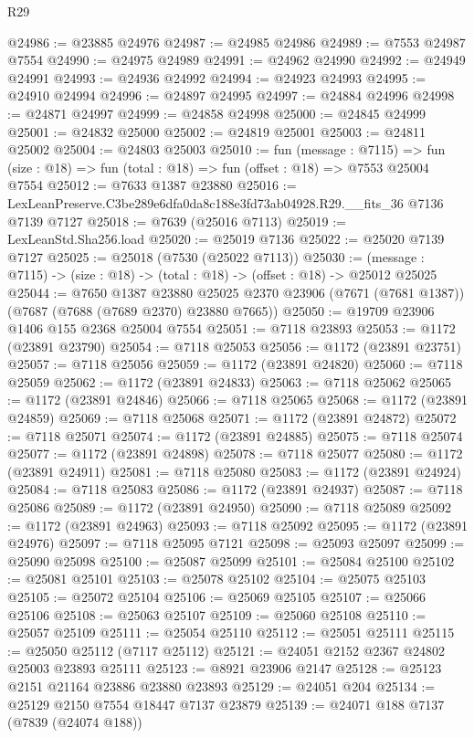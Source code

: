 \begin{lexlean}{R29}
\begin{coremodule}
@24986 := @23885 @24976
@24987 := @24985 @24986
@24989 := @7553 @24987 @7554
@24990 := @24975 @24989
@24991 := @24962 @24990
@24992 := @24949 @24991
@24993 := @24936 @24992
@24994 := @24923 @24993
@24995 := @24910 @24994
@24996 := @24897 @24995
@24997 := @24884 @24996
@24998 := @24871 @24997
@24999 := @24858 @24998
@25000 := @24845 @24999
@25001 := @24832 @25000
@25002 := @24819 @25001
@25003 := @24811 @25002
@25004 := @24803 @25003
@25010 := fun (message : @7115) =>
  fun (size : @18) => fun (total : @18) => fun (offset : @18) => @7553 @25004 @7554
@25012 := @7633 @1387 @23880
@25016 := LexLeanPreserve.C3be289e6dfa0da8c188e3fd73ab04928.R29.__fits_36 @7136 @7139 @7127
@25018 := @7639 (@25016 @7113)
@25019 := LexLeanStd.Sha256.load
@25020 := @25019 @7136
@25022 := @25020 @7139 @7127
@25025 := @25018 (@7530 (@25022 @7113))
@25030 := (message : @7115) -> (size : @18) -> (total : @18) -> (offset : @18) -> @25012 @25025
@25044 := @7650
    @1387
    @23880
    @25025
    @2370
    @23906
    (@7671 (@7681 @1387))
    (@7687 (@7688 (@7689 @2370) @23880 @7665))
@25050 := @19709 @23906 @1406 @155 @2368 @25004 @7554
@25051 := @7118 @23893
@25053 := @1172 (@23891 @23790)
@25054 := @7118 @25053
@25056 := @1172 (@23891 @23751)
@25057 := @7118 @25056
@25059 := @1172 (@23891 @24820)
@25060 := @7118 @25059
@25062 := @1172 (@23891 @24833)
@25063 := @7118 @25062
@25065 := @1172 (@23891 @24846)
@25066 := @7118 @25065
@25068 := @1172 (@23891 @24859)
@25069 := @7118 @25068
@25071 := @1172 (@23891 @24872)
@25072 := @7118 @25071
@25074 := @1172 (@23891 @24885)
@25075 := @7118 @25074
@25077 := @1172 (@23891 @24898)
@25078 := @7118 @25077
@25080 := @1172 (@23891 @24911)
@25081 := @7118 @25080
@25083 := @1172 (@23891 @24924)
@25084 := @7118 @25083
@25086 := @1172 (@23891 @24937)
@25087 := @7118 @25086
@25089 := @1172 (@23891 @24950)
@25090 := @7118 @25089
@25092 := @1172 (@23891 @24963)
@25093 := @7118 @25092
@25095 := @1172 (@23891 @24976)
@25097 := @7118 @25095 @7121
@25098 := @25093 @25097
@25099 := @25090 @25098
@25100 := @25087 @25099
@25101 := @25084 @25100
@25102 := @25081 @25101
@25103 := @25078 @25102
@25104 := @25075 @25103
@25105 := @25072 @25104
@25106 := @25069 @25105
@25107 := @25066 @25106
@25108 := @25063 @25107
@25109 := @25060 @25108
@25110 := @25057 @25109
@25111 := @25054 @25110
@25112 := @25051 @25111
@25115 := @25050 @25112 (@7117 @25112)
@25121 := @24051 @2152 @2367 @24802 @25003 @23893 @25111
@25123 := @8921 @23906 @2147
@25128 := @25123 @2151 @21164 @23886 @23880 @23893
@25129 := @24051 @204
@25134 := @25129 @2150 @7554 @18447 @7137 @23879
@25139 := @24071 @188 @7137 (@7839 (@24074 @188))

\end{coremodule}
\end{lexlean}
